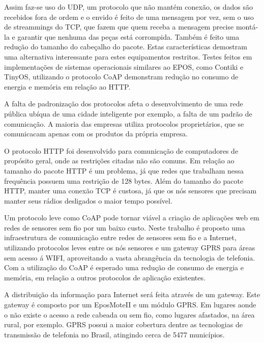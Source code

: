 Assim faz-se uso do UDP, um protocolo que n\~ao mant\'em conex\~ao, os dados s\~ao recebidos fora de ordem e o envido \'e feito de uma mensagem por vez, sem o uso de streammings do TCP, que fazem que quem receba a mensagem precise mont\'a-la e garantir que nenhuma das pe\c{c}as est\'a corrompida. Tamb\'em \'e feito uma redu\c{c}\~ao do tamanho do cabe\c{c}alho do pacote. Estas caracter\'isticas demostram uma alternativa interessante para estes equipamentos restritos. Testes feitos em implementa\c{c}\~oes de sistemas operacionais similares ao EPOS, como Contiki e TinyOS, utilizando o protocolo CoAP demonstram redu\c{c}\~ao no consumo de energia e mem\'oria em rela\c{c}\~ao ao HTTP.\cite{}

A falta de padroniza\c{c}\~ao dos protocolos afeta o desenvolvimento de uma rede p\'ublica ub\'iqua de uma cidade inteligente por exemplo, a falta de um padr\~ao de comunica\c{c}\~ao. A maioria das empresas utiliza protocolos propriet\'arios, que se comunicacam apenas com os produtos da pr\'opria empresa.

O protocolo HTTP foi desenvolvido para comunica\c{c}\~ao de computadores de prop\'osito geral, onde as restri\c{c}\~oes citadas n\~ao s\~ao comuns. Em rela\c{c}\~ao ao tamanho do pacote HTTP \'e um problema, j\'a que redes que trabalham nessa frequ\^encia possuem uma restri\c{c}\~ao de 128 bytes.  Al\'em do tamanho do pacote HTTP, manter uma conex\~ao TCP \'e custosa, j\'a que os n\'os sensores que precisam manter seus r\'adios desligados o maior tempo poss\'ivel.

Um protocolo leve como CoAP pode tornar vi\'avel a cria\c{c}\~ao de aplica\c{c}\~oes web em redes de sensores sem fio por um baixo custo. Neste trabalho \'e proposto uma infraestrutura de comunica\c{c}\~ao entre redes de sensores sem fio e a Internet, utilizando protocolos leves entre os n\'os sensores e um gateway GPRS para \'areas sem acesso \'a WIFI, aproveitando a vasta abrang\^encia da tecnologia de telefonia. Com a utiliza\c{c}\~ao do CoAP \'e esperado uma redu\c{c}\~ao de consumo de energia e mem\'oria, em rela\c{c}\~ao a outros protocolos de aplica\c{c}\~ao existentes.

A distribui\c{c}\~ao da informa\c{c}\~ao para Internet ser\'a feita atrav\'es de um gateway. Este gateway \'e composto por um EposMoteII e um m\'odulo GPRS. Em lugares aonde o n\~ao existe o acesso a rede cabeada ou sem fio, como lugares afastados, na \'area rural, por exemplo. GPRS possui a maior cobertura dentre as tecnologias de transmiss\~ao de telefonia no Brasil, atingindo cerca de 5477 munic\'ipios.

